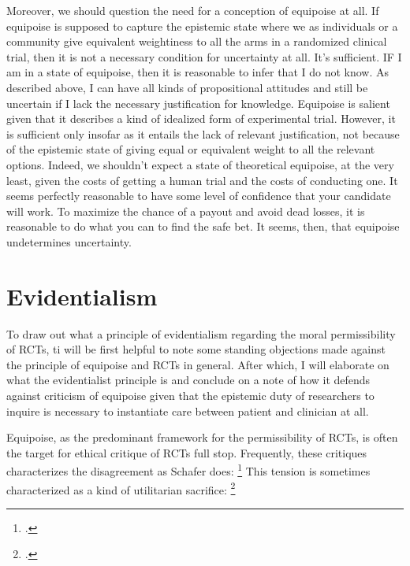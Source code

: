 \documentclass[letterpaper,notitlepage,12pt]{article}
\begin{document}
Moreover, we should question the need for a conception of equipoise at all.
If equipoise is supposed to capture the epistemic state where we as individuals
or a community give equivalent weightiness to all the arms in a
randomized clinical trial, then it is not a necessary
condition for uncertainty at all.
It's sufficient.
IF I am in a state of equipoise, then it is reasonable to infer that I do not
know.
As described above, I can have all kinds of propositional attitudes and still be
uncertain if I lack the necessary justification for knowledge.
Equipoise is salient given that it describes a kind of idealized form of
experimental trial.
However, it is sufficient only insofar as it entails the lack of relevant
justification, not because of the epistemic state of giving equal or
equivalent weight to all the relevant options.
Indeed, we shouldn't expect a state of theoretical equipoise, at the very least, 
given the costs of getting a human trial and the
costs of conducting one.
It seems perfectly reasonable to have some level of confidence that your
candidate will work.
To maximize the chance of a payout and avoid dead losses, it is reasonable to do
what you can to find the safe bet.
It seems, then, that equipoise undetermines uncertainty.

\section{Evidentialism}

To draw out what a principle of evidentialism regarding the moral permissibility
of RCTs, ti will be first helpful to note some standing objections made against
the principle of equipoise and RCTs in general.
After which, I will elaborate on what the evidentialist principle is and
conclude on a note of how it defends against criticism of equipoise given that
the epistemic duty of researchers to inquire is necessary to instantiate care 
between patient and clinician at all.

Equipoise, as the predominant framework for the permissibility of RCTs, is often
the target for ethical critique of RCTs full stop.
Frequently, these critiques characterizes the disagreement as Schafer does:
\footcite[p. 4--5]{schafer_commentary_1985}
This tension is sometimes characterized as a kind of utilitarian sacrifice:
\footcite[p. 1566]{hellman_mice_1991}
\end{document}
